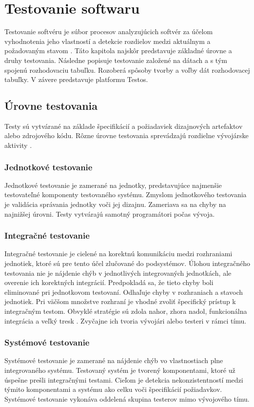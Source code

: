 \chapter{Testovanie softwaru}
\label{testing}
Testovanie softvéru je súbor procesov analyzujúcich softvér za účelom vyhodnotenia jeho vlastností a detekcie rozdielov medzi aktuálnym a požadovaným stavom \cite{Standard}. Táto kapitola najskôr predstavuje základné úrovne a druhy testovania. Následne popisuje testovanie založené na dátach a s tým spojenú rozhodovaciu tabuľku. Rozoberá spôsoby tvorby a voľby dát rozhodovacej tabuľky. V závere predstavuje platformu Testos.   

\bigskip
\section{Úrovne testovania}
Testy sú vytvárané na základe špecifikácií a požiadaviek dizajnových artefaktov alebo zdrojového kódu. Rôzne úrovne testovania sprevádzajú rozdielne vývojárske aktivity \cite{Ist}.
\subsection*{Jednotkové testovanie}
Jednotkové testovanie je zamerané na jednotky, predstavujúce najmenšie testovateľné komponenty testovaného systému. Zmyslom jednotkového testovania je validácia správania jednotky voči jej dizajnu. Zameriava sa na chyby na najnižšej úrovni. Testy vytvárajú samotný programátori počas vývoja.    
\subsection*{Integračné testovanie}
Integračné testovanie je cielené na korektnú komunikáciu medzi rozhraniami jednotiek, ktoré sú pre tento účel zlučované do podsystémov. Úlohou integračného testovania nie je nájdenie chýb v jednotlivých integrovaných jednotkách, ale overenie ich korektných integrácií. Predpokladá sa, že tieto chyby boli eliminované pri jednotkovom testovaní. Odhaľuje chyby v rozhraniach a stavoch jednotiek. Pri väčšom množstve rozhraní je vhodné zvoliť špecifický prístup k integračným testom. Obvyklé stratégie sú zdola nahor, zhora nadol, funkcionálna integrácia a veľký tresk \cite{Gst}. Zvyčajne ich tvoria vývojári alebo testeri v rámci tímu.
\subsection*{Systémové testovanie}
Systémové testovanie je zamerané na nájdenie chýb vo vlastnostiach plne integrovaného systému. Testovaný systém je tvorený komponentami, ktoré už úspešne prešli integračnými testami. Cieľom je detekcia nekonzistentností medzi týmito komponentami a systému ako celku voči špecifikácií požiadavkov. Systémové testovanie vykonáva oddelená skupina testerov mimo vývojového tímu. 

